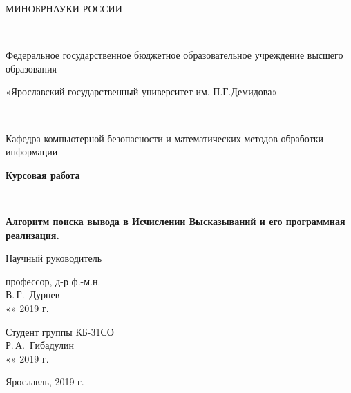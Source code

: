\documentclass[a4paper,12pt]{article}
\theoremstyle{definition}
\begin{document}
	
	
	\begin{titlepage}
		\begin{center}
			{\large МИНОБРНАУКИ РОССИИ
				
				~
				
				Федеральное государственное бюджетное образовательное учреждение высшего образования
					
				«Ярославский государственный университет им. П.Г.Демидова»
				
				~
				
				Кафедра компьютерной безопасности и
				математических методов обработки информации}
			\vfill
			
			\textbf{{\large Курсовая работа}}
			
			~
			
			\textbf{{\large Алгоритм поиска вывода в Исчислении Высказываний и его программная реализация.}}
		\end{center}
		\vfill
		
		\newlength{\ML}
		\hfill\begin{minipage}{0.4\textwidth}
			Научный руководитель
			
			профессор, д-р ф.-м.н.
			\\
			\underline{\hspace{\ML}} В.\,Г.~Дурнев\\
			«\underline{\hspace{0.7cm}}» \underline{\hspace{2cm}} 2019 г.
		\end{minipage}%
		\bigskip
		
		\hfill\begin{minipage}{0.4\textwidth}
			Студент группы КБ-31СО
			\\
			\underline{\hspace{\ML}} Р.\,А.~Гибадулин\\
			«\underline{\hspace{0.7cm}}» \underline{\hspace{2cm}} 2019 г.
		\end{minipage}%
		\vfill
		
		\begin{center}
			Ярославль, 2019 г.
		\end{center}
	\end{titlepage}
	
\end{document}
